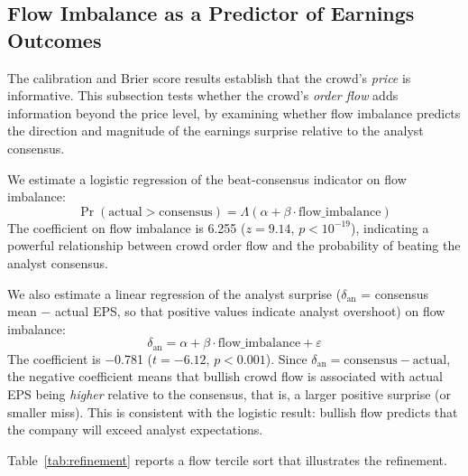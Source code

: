 \documentclass[11pt]{article}
\begin{document}
\subsection{Flow Imbalance as a Predictor of Earnings Outcomes}

The calibration and Brier score results establish that the crowd's \textit{price} is informative. This subsection tests whether the crowd's \textit{order flow} adds information beyond the price level, by examining whether flow imbalance predicts the direction and magnitude of the earnings surprise relative to the analyst consensus.

We estimate a logistic regression of the beat-consensus indicator on flow imbalance:
\begin{equation}
\Pr(\text{actual} > \text{consensus}) = \Lambda(\alpha + \beta \cdot \text{flow\_imbalance})
\end{equation}
The coefficient on flow imbalance is 6.255 ($z = 9.14$, $p < 10^{-19}$), indicating a powerful relationship between crowd order flow and the probability of beating the analyst consensus.

We also estimate a linear regression of the analyst surprise ($\delta_{\text{an}}$ = consensus mean $-$ actual EPS, so that positive values indicate analyst overshoot) on flow imbalance:
\begin{equation}
\delta_{\text{an}} = \alpha + \beta \cdot \text{flow\_imbalance} + \varepsilon
\end{equation}
The coefficient is $-$0.781 ($t = -6.12$, $p < 0.001$). Since $\delta_{\text{an}} = \text{consensus} - \text{actual}$, the negative coefficient means that bullish crowd flow is associated with actual EPS being \textit{higher} relative to the consensus, that is, a larger positive surprise (or smaller miss). This is consistent with the logistic result: bullish flow predicts that the company will exceed analyst expectations.

Table~\ref{tab:refinement} reports a flow tercile sort that illustrates the refinement.
\end{document}
